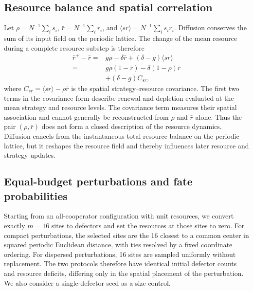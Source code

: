 \subsection{Resource balance and spatial correlation}

Let $\rho=N^{-1}\sum_i s_i$, $\bar r=N^{-1}\sum_i r_i$, and $\langle sr\rangle=N^{-1}\sum_i s_i r_i$. Diffusion conserves the sum of its input field on the periodic lattice. The change of the mean resource during a complete resource substep is therefore
\begin{equation}
\label{eq:balance}
\begin{aligned}
\bar r^+-\bar r
={}&g\rho-\delta\bar r+(\delta-g)\langle sr\rangle\\
={}&g\rho(1-\bar r)-\delta(1-\rho)\bar r\\
&+(\delta-g)C_{sr},
\end{aligned}
\end{equation}
where $C_{sr}=\langle sr\rangle-\rho\bar r$ is the spatial strategy--resource covariance. The first two terms in the covariance form describe renewal and depletion evaluated at the mean strategy and resource levels. The covariance term measures their spatial association and cannot generally be reconstructed from $\rho$ and $\bar r$ alone. Thus the pair $(\rho,\bar r)$ does not form a closed description of the resource dynamics. Diffusion cancels from the instantaneous total-resource balance on the periodic lattice, but it reshapes the resource field and thereby influences later resource and strategy updates.

\subsection{Equal-budget perturbations and fate probabilities}

Starting from an all-cooperator configuration with unit resources, we convert exactly $m=16$ sites to defectors and set the resources at those sites to zero. For compact perturbations, the selected sites are the 16 closest to a common center in squared periodic Euclidean distance, with ties resolved by a fixed coordinate ordering. For dispersed perturbations, 16 sites are sampled uniformly without replacement. The two protocols therefore have identical initial defector counts and resource deficits, differing only in the spatial placement of the perturbation. We also consider a single-defector seed as a size control.

